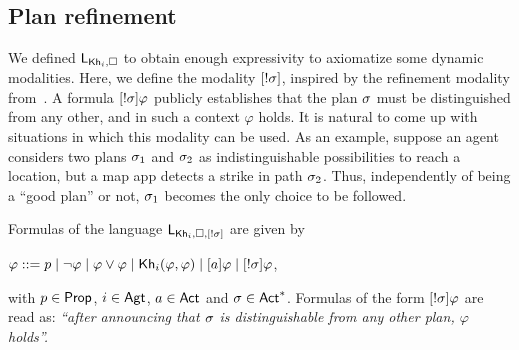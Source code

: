 \subsection{Plan refinement}
\label{sec:planref}

We defined $\mathsf{L}_{{\sf Kh}_i,\square}$ to obtain enough expressivity to axiomatize some dynamic modalities. Here, we define the modality $[!\sigma]$, inspired by the refinement modality from~. A formula $[!\sigma]\varphi$ publicly establishes that the plan $\sigma$ must be distinguished from any other, and in such a context $\varphi$ holds. It is natural to come up with situations in which this modality can be used. As an example, suppose an agent considers two plans $\sigma_1$ and $\sigma_2$ as indistinguishable possibilities to reach a location, but a map app detects a strike in path $\sigma_2$. Thus, independently of being a ``good plan'' or not, $\sigma_1$ becomes the only choice to be followed.


\medskip 

\begin{definition}\label{def:srefsyntax}
Formulas of the language $\mathsf{L}_{{\sf Kh}_i,\square,[!\sigma]}$ are given by
\begin{spcenter}
$\varphi ::= p \mid \neg\varphi \mid \varphi\vee\varphi \mid {\sf Kh}_i(\varphi,\varphi) \mid [a]\varphi \mid [!\sigma]\varphi$,
\end{spcenter}
with $p \in {\rm \sf Prop}$, $i\in{\rm \sf Agt}$, $a \in {\rm \sf Act}$ and $\sigma \in {\rm \sf Act}^*$.  Formulas of the form $[!\sigma]\varphi$ are read as: \emph{``after announcing that $\sigma$ is distinguishable from any other plan, $\varphi$ holds''.} 
\end{definition}

\medskip 

